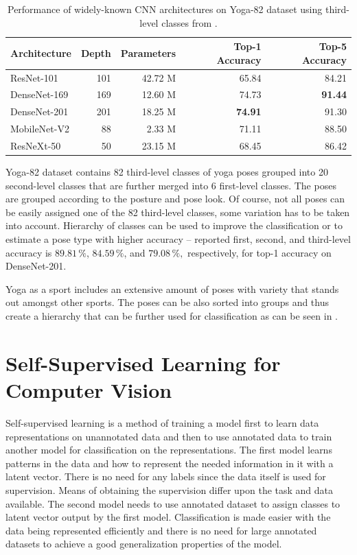 \begin{table}[ht]
    \centering
    \begin{tabular}{l r r r r}
        \hline
        Architecture & Depth & Parameters & Top-1 Accuracy & Top-5 Accuracy \\
        \hline
        ResNet-101 & 101 & 42.72 M & 65.84 & 84.21 \\
        DenseNet-169 & 169 & 12.60 M & 74.73 & \textbf{91.44} \\
        DenseNet-201 & 201 & 18.25 M & \textbf{74.91} & 91.30 \\
        MobileNet-V2 & 88 & 2.33 M & 71.11 & 88.50 \\
        ResNeXt-50 & 50 & 23.15 M & 68.45 & 86.42 \\
        \hline
    \end{tabular}
    \caption{Performance of widely-known CNN architectures on Yoga-82 dataset using third-level classes from \cite{verma2020yoga}.}
    \label{tab:yoga82-results}
\end{table}

Yoga-82 dataset contains 82 third-level classes of yoga poses grouped into 20 second-level classes that are further merged into 6 first-level classes. The poses are grouped according to the posture and pose look. Of course, not all poses can be easily assigned one of the 82 third-level classes, some variation has to be taken into account. Hierarchy of classes can be used to improve the classification or to estimate a pose type with higher accuracy -- reported first, second, and third-level accuracy is $89.81\,\%$, $84.59\,\%$, and $79.08\,\%,$ respectively, for top-1 accuracy on DenseNet-201.

Yoga as a sport includes an extensive amount of poses with variety that stands out amongst other sports. The poses can be also sorted into groups and thus create a hierarchy that can be further used for classification as can be seen in \cite{verma2020yoga}.

\section{\label{sec:self-supervised}Self-Supervised Learning for Computer Vision}

Self-supervised learning is a method of training a model first to learn data representations on unannotated data and then to use annotated data to train another model for classification on the representations. The first model learns patterns in the data and how to represent the needed information in it with a latent vector. There is no need for any labels since the data itself is used for supervision. Means of obtaining the supervision differ upon the task and data available. The second model needs to use annotated dataset to assign classes to latent vector output by the first model. Classification is made easier with the data being represented efficiently and there is no need for large annotated datasets to achieve a good generalization properties of the model.

